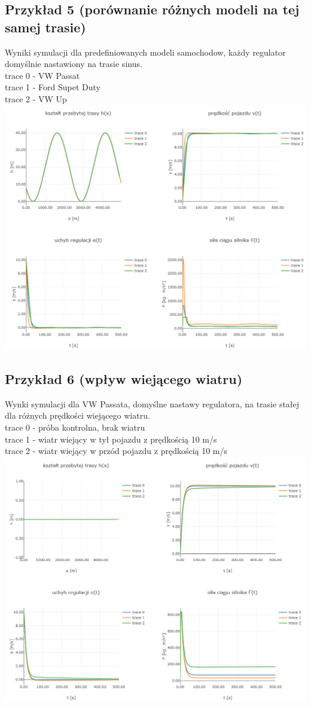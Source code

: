 \documentclass[12pt,a4paper]{article}
\begin{document}
	\subsection{Przykład 5 (porównanie różnych modeli na tej samej trasie)}
	Wyniki symulacji dla predefiniowanych modeli samochodow, każdy regulator domyślnie nastawiony na trasie sinus. \\
	trace 0 - VW Passat \\
	trace 1 - Ford Supet Duty \\
	trace 2 - VW Up \\
	
	\includegraphics[width=0.9\linewidth]{"zrzut 5.png"}
	\newpage
	\subsection{Przykład 6 (wpływ wiejącego wiatru)}
	Wynki symulacji dla VW Passata, domyślne nastawy regulatora, na trasie stałej dla różnych prędkości wiejącego wiatru. \\
	trace 0 - próba kontrolna, brak wiatru \\
	trace 1 - wiatr wiejący w tył pojazdu z prędkością 10 m/s \\
	trace 2 - wiatr wiejący w przód pojazdu z prędkością 10 m/s \\
	
	\includegraphics[width=0.9\linewidth]{"zrzut 6.png"}
\end{document}
